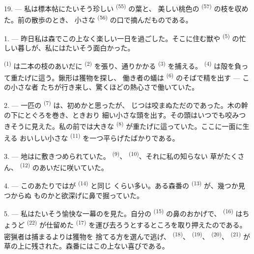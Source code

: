 19. --- 私は標本帖にたいそう珍しい \textsuperscript{(55)} の葉と、
美しい桃色の \textsuperscript{(57)} の枝を収めた。前の散歩のとき、
小さな \textsuperscript{(56)} の口で摘んだものである。

\VUsaut{3.0mm}
\VUsaut{3.0mm}

\VUsaut{3.0mm}

1. --- 昨日私は森でこの上なく楽しい一日を過ごした。そこに住む獣や
 \textsuperscript{(5)} の忙しい暮しが、私にはたいそう面白かった。

 \textsuperscript{(1)} は二本の枝のあいだに
\textsuperscript{(2)} を張り、通りかかる \textsuperscript{(3)} を捕える。
 \textsuperscript{(4)} は殻を負って重たげに這う。鍬形は獲物を探し、
働き者の蟻は \textsuperscript{(6)} のそばで精を出す --- この小さな者
たちが行き来し、驚くほどの熱心さで働いていた。

2. --- 一匹の \textsuperscript{(7)} は、初めかと思ったが、
じつは咬まぬただのであった。木の幹の下にとぐろを巻き、ときおり
細い小さな頭を出す。その頭はいつでも咬みつきそうに見えた。私の前では大きな
 \textsuperscript{(8)} が重たげに這っていた。ここに一面に生える
おいしい小さな \textsuperscript{(11)} を一つ平らげたばかりである。

3. --- 地はに敷きつめられていた。
\textsuperscript{(9)}、 \textsuperscript{(10)}、それに私の知らない
草がたくさん、 \textsuperscript{(12)} のあいだに咲いていた。

4. --- このあたりではが \textsuperscript{(14)} と同じ
くらい多い。ある森番の \textsuperscript{(13)} が、幾つか見つからぬ
ものかと欲深げに鼻で掘っていた。

\VUsaut{3.0mm}
\VUsaut{3.0mm}

5. --- 私はたいそう愉快な一幕のを見た。自分の
\textsuperscript{(15)} の鼻のおかげで、 \textsuperscript{(16)} はちょうど
 \textsuperscript{(22)} が仕留めた \textsuperscript{(17)}
を運び去ろうとするところを取り押えたのである。密猟者は捕まるよりは獲物を
捨てる方を選んで逃げ、 \textsuperscript{(18)}、
\textsuperscript{(19)}、 \textsuperscript{(20)}、
\textsuperscript{(21)} が草の上に残された。森番にはこの上ない喜びである。

